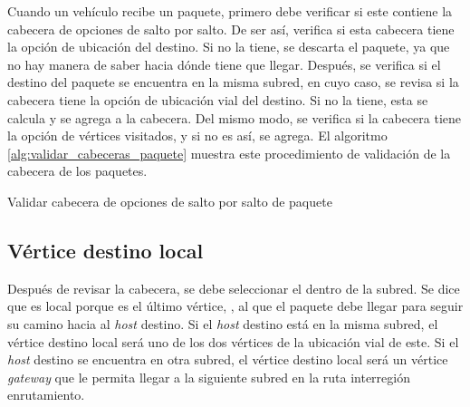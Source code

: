 \label{subsec:verificacion_cabecera_opciones_salto_por_salto}

Cuando un vehículo recibe un paquete, primero debe verificar si este contiene
la cabecera de opciones de salto por salto. De ser así, verifica si esta
cabecera tiene la opción de ubicación del destino. Si no la tiene, se descarta
el paquete, ya que no hay manera de saber hacia dónde tiene que llegar.
Después, se verifica si el destino del paquete se encuentra en la misma subred,
en cuyo caso, se revisa si la cabecera tiene la opción de ubicación vial del
destino. Si no la tiene, esta se calcula y se agrega a la cabecera. Del mismo
modo, se verifica si la cabecera tiene la opción de vértices visitados, y si no
es así, se agrega. El algoritmo \ref{alg:validar_cabeceras_paquete} muestra
este procedimiento de validación de la cabecera de los paquetes.

\begin{algorithm}[th!]
\caption{Validar cabecera de opciones de salto por salto de paquete}
\label{alg:validar_cabeceras_paquete}
\DontPrintSemicolon
\LinesNumbered
\end{algorithm}

\subsection{Vértice destino local}

\label{subsec:vertice_destino_local}

Después de revisar la cabecera, se debe seleccionar el  dentro de la subred. Se dice que es local porque es el último vértice,
, al que el paquete debe llegar para
seguir su camino hacia al \textit{host} destino. Si el \textit{host} destino
está en la misma subred, el vértice destino local será uno de los dos vértices
de la ubicación vial de este. Si el \textit{host} destino se encuentra en otra
subred, el vértice destino local será un vértice \textit{gateway} que le
permita llegar a la siguiente subred en la ruta interregión enrutamiento.

